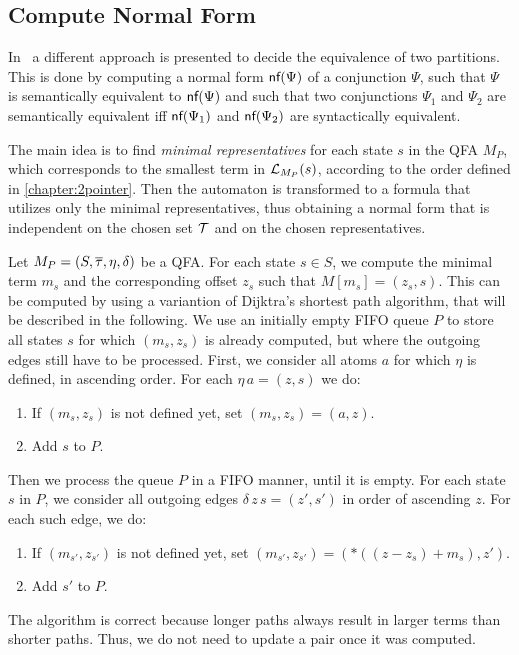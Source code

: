 \subsection{Compute Normal Form}

In~\cite{2pointer} a different approach is presented to decide the equivalence of two partitions.
This is done by computing a normal form $\textsf{nf}(\Psi)$ of a conjunction $\Psi$, such that $\Psi$ is semantically equivalent to $\textsf{nf}(\Psi)$ and such that two conjunctions $\Psi_1$ and $\Psi_2$ are semantically equivalent iff $\textsf{nf}(\Psi_1)$ and $\textsf{nf}(\Psi_2)$ are syntactically equivalent.

The main idea is to find \emph{minimal representatives} for each state $s$ in the QFA $M_P$,
which corresponds to the smallest term in $\mathcal{L}_{M_P}(s)$, according to the order defined in \cref{chapter:2pointer}.
Then the automaton is transformed to a formula that utilizes only the minimal representatives, thus obtaining a normal form
that is independent on the chosen set $\mathcal{T}$ and on the chosen representatives.

Let $M_P = (S, \overline{\tau}, \eta, \delta)$ be a QFA.\@
For each state $s \in S$, we compute the minimal term $m_s$ and the corresponding offset $z_s$ such that $M[m_s] = (z_s,s)$.
This can be computed by using a variantion of Dijktra's shortest path algorithm,
that will be described in the following.
We use an initially empty FIFO queue $P$ to store all states $s$ for which $(m_s,z_s)$ is already computed,
but where the outgoing edges still have to be processed.
First, we consider all atoms $a$ for which $\eta$ is defined, in ascending order. For each $\eta\,a = (z,s)$ we do:
\begin{enumerate}
    \item If $(m_s,z_s)$ is not defined yet, set $(m_s,z_s) = (a,z)$.
    \item Add $s$ to $P$.
\end{enumerate}
Then we process the queue $P$ in a FIFO manner, until it is empty.
For each state $s$ in $P$, we consider all outgoing edges $\delta\,z\,s = (z',s')$ in order of ascending $z$.
For each such edge, we do:
\begin{enumerate}
    \item If $(m_{s'},z_{s'})$ is not defined yet, set $(m_{s'},z_{s'}) = (*((z-z_s)+m_s),z')$.
    \item Add $s'$ to $P$.
\end{enumerate}
The algorithm is correct because longer paths always result in larger terms than shorter paths.
Thus, we do not need to update a pair once it was computed.

